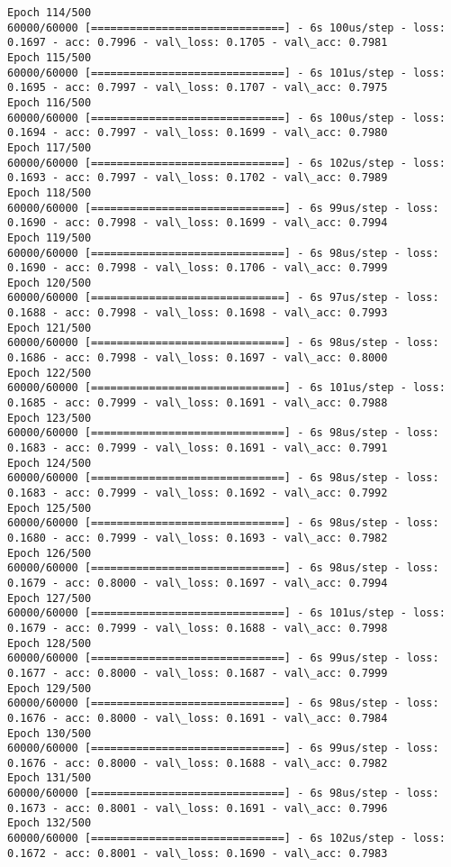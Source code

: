 \documentclass[11pt]{article}
\begin{document}
\begin{Verbatim}[commandchars=\\\{\}]
Epoch 114/500
60000/60000 [==============================] - 6s 100us/step - loss: 0.1697 - acc: 0.7996 - val\_loss: 0.1705 - val\_acc: 0.7981
Epoch 115/500
60000/60000 [==============================] - 6s 101us/step - loss: 0.1695 - acc: 0.7997 - val\_loss: 0.1707 - val\_acc: 0.7975
Epoch 116/500
60000/60000 [==============================] - 6s 100us/step - loss: 0.1694 - acc: 0.7997 - val\_loss: 0.1699 - val\_acc: 0.7980
Epoch 117/500
60000/60000 [==============================] - 6s 102us/step - loss: 0.1693 - acc: 0.7997 - val\_loss: 0.1702 - val\_acc: 0.7989
Epoch 118/500
60000/60000 [==============================] - 6s 99us/step - loss: 0.1690 - acc: 0.7998 - val\_loss: 0.1699 - val\_acc: 0.7994
Epoch 119/500
60000/60000 [==============================] - 6s 98us/step - loss: 0.1690 - acc: 0.7998 - val\_loss: 0.1706 - val\_acc: 0.7999
Epoch 120/500
60000/60000 [==============================] - 6s 97us/step - loss: 0.1688 - acc: 0.7998 - val\_loss: 0.1698 - val\_acc: 0.7993
Epoch 121/500
60000/60000 [==============================] - 6s 98us/step - loss: 0.1686 - acc: 0.7998 - val\_loss: 0.1697 - val\_acc: 0.8000
Epoch 122/500
60000/60000 [==============================] - 6s 101us/step - loss: 0.1685 - acc: 0.7999 - val\_loss: 0.1691 - val\_acc: 0.7988
Epoch 123/500
60000/60000 [==============================] - 6s 98us/step - loss: 0.1683 - acc: 0.7999 - val\_loss: 0.1691 - val\_acc: 0.7991
Epoch 124/500
60000/60000 [==============================] - 6s 98us/step - loss: 0.1683 - acc: 0.7999 - val\_loss: 0.1692 - val\_acc: 0.7992
Epoch 125/500
60000/60000 [==============================] - 6s 98us/step - loss: 0.1680 - acc: 0.7999 - val\_loss: 0.1693 - val\_acc: 0.7982
Epoch 126/500
60000/60000 [==============================] - 6s 98us/step - loss: 0.1679 - acc: 0.8000 - val\_loss: 0.1697 - val\_acc: 0.7994
Epoch 127/500
60000/60000 [==============================] - 6s 101us/step - loss: 0.1679 - acc: 0.7999 - val\_loss: 0.1688 - val\_acc: 0.7998
Epoch 128/500
60000/60000 [==============================] - 6s 99us/step - loss: 0.1677 - acc: 0.8000 - val\_loss: 0.1687 - val\_acc: 0.7999
Epoch 129/500
60000/60000 [==============================] - 6s 98us/step - loss: 0.1676 - acc: 0.8000 - val\_loss: 0.1691 - val\_acc: 0.7984
Epoch 130/500
60000/60000 [==============================] - 6s 99us/step - loss: 0.1676 - acc: 0.8000 - val\_loss: 0.1688 - val\_acc: 0.7982
Epoch 131/500
60000/60000 [==============================] - 6s 98us/step - loss: 0.1673 - acc: 0.8001 - val\_loss: 0.1691 - val\_acc: 0.7996
Epoch 132/500
60000/60000 [==============================] - 6s 102us/step - loss: 0.1672 - acc: 0.8001 - val\_loss: 0.1690 - val\_acc: 0.7983

\end{Verbatim}
\end{document}
